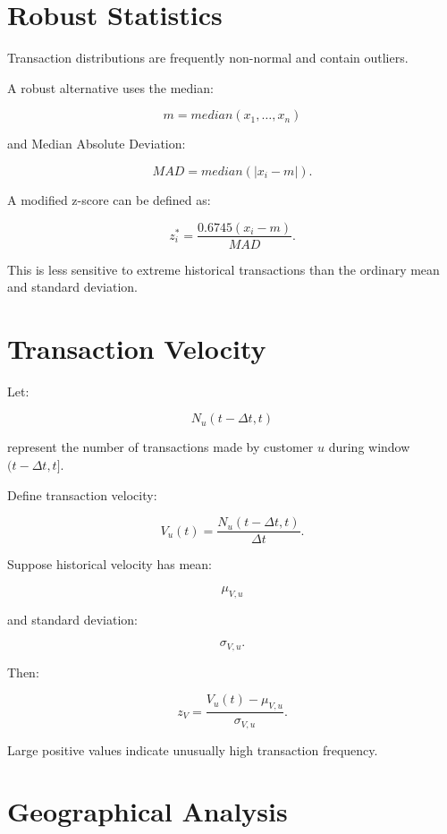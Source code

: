 \documentclass[11pt,a4paper]{article}
\begin{document}
\section{Robust Statistics}

Transaction distributions are frequently non-normal and contain
outliers.

A robust alternative uses the median:

\[
m = median(x_1,\ldots,x_n)
\]

and Median Absolute Deviation:

\[
MAD
=
median(|x_i-m|).
\]

A modified z-score can be defined as:

\[
z_i^{*}
=
\frac{0.6745(x_i-m)}{MAD}.
\]

This is less sensitive to extreme historical transactions than the
ordinary mean and standard deviation.

\section{Transaction Velocity}

Let:

\[
N_u(t-\Delta t,t)
\]

represent the number of transactions made by customer \(u\) during
window \((t-\Delta t,t]\).

Define transaction velocity:

\[
V_u(t)
=
\frac{N_u(t-\Delta t,t)}{\Delta t}.
\]

Suppose historical velocity has mean:

\[
\mu_{V,u}
\]

and standard deviation:

\[
\sigma_{V,u}.
\]

Then:

\[
z_V
=
\frac{V_u(t)-\mu_{V,u}}
{\sigma_{V,u}}.
\]

Large positive values indicate unusually high transaction frequency.

\section{Geographical Analysis}
\end{document}

